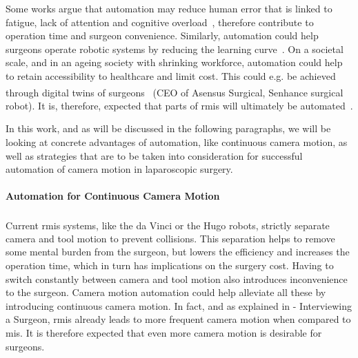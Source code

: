
Some works argue that automation may reduce human error that is linked to fatigue, lack of attention and cognitive overload~\cite{fiorini2022concepts}, therefore contribute to operation time and surgeon convenience. Similarly, automation could help surgeons operate robotic systems by reducing the learning curve~\cite{van2018learning}. On a societal scale, and in an ageing society with shrinking workforce, automation could help to retain accessibility to healthcare and limit cost. This could e.g. be achieved through digital twins of surgeons~\cite{zidane2023robotics} (CEO of Asensus Surgical, Senhance\textsuperscript{\texttrademark} surgical robot). It is, therefore, expected that parts of \gls{rmis} will ultimately be automated~\cite{davenport2019potential,zidane2023robotics}.

In this work, and as will be discussed in the following paragraphs, we will be looking at concrete advantages of automation, like continuous camera motion, as well as strategies that are to be taken into consideration for successful automation of camera motion in laparoscopic surgery.


\paragraph{Automation for Continuous Camera Motion} Current \gls{rmis} systems, like the da Vinci\textsuperscript{\textregistered} or the Hugo\textsuperscript{\texttrademark} robots, strictly separate camera and tool motion to prevent collisions. This separation helps to remove some mental burden from the surgeon, but lowers the efficiency and increases the operation time, which in turn has implications on the surgery cost. Having to switch constantly between camera and tool motion also introduces inconvenience to the surgeon. Camera motion automation could help alleviate all these by introducing continuous camera motion. In fact, and as explained in  - Interviewing a Surgeon, \gls{rmis} already leads to more frequent camera motion when compared to \gls{mis}. It is therefore expected that even more camera motion is desirable for surgeons.

